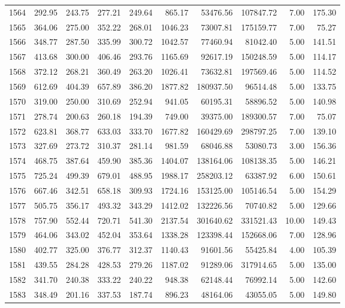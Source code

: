 \begin{tabular}{lrrrrrrrrr}
1564 & 292.95 & 243.75 & 277.21 & 249.64 & 865.17 & 53476.56 & 107847.72 & 7.00 & 175.30 \\
1565 & 364.06 & 275.00 & 352.22 & 268.01 & 1046.23 & 73007.81 & 175159.77 & 7.00 & 75.27 \\
1566 & 348.77 & 287.50 & 335.99 & 300.72 & 1042.57 & 77460.94 & 81042.40 & 5.00 & 141.51 \\
1567 & 413.68 & 300.00 & 406.46 & 293.76 & 1165.69 & 92617.19 & 150248.59 & 5.00 & 114.17 \\
1568 & 372.12 & 268.21 & 360.49 & 263.20 & 1026.41 & 73632.81 & 197569.46 & 5.00 & 114.52 \\
1569 & 612.69 & 404.39 & 657.89 & 386.20 & 1877.82 & 180937.50 & 96514.48 & 5.00 & 133.75 \\
1570 & 319.00 & 250.00 & 310.69 & 252.94 & 941.05 & 60195.31 & 58896.52 & 5.00 & 140.98 \\
1571 & 278.74 & 200.63 & 260.18 & 194.39 & 749.00 & 39375.00 & 189300.57 & 7.00 & 75.07 \\
1572 & 623.81 & 368.77 & 633.03 & 333.70 & 1677.82 & 160429.69 & 298797.25 & 7.00 & 139.10 \\
1573 & 327.69 & 273.72 & 310.37 & 281.14 & 981.59 & 68046.88 & 53080.73 & 3.00 & 156.36 \\
1574 & 468.75 & 387.64 & 459.90 & 385.36 & 1404.07 & 138164.06 & 108138.35 & 5.00 & 146.21 \\
1575 & 725.24 & 499.39 & 679.01 & 488.95 & 1988.17 & 258203.12 & 63387.92 & 6.00 & 150.61 \\
1576 & 667.46 & 342.51 & 658.18 & 309.93 & 1724.16 & 153125.00 & 105146.54 & 5.00 & 154.29 \\
1577 & 505.75 & 356.17 & 493.32 & 343.29 & 1412.02 & 132226.56 & 70740.82 & 5.00 & 129.66 \\
1578 & 757.90 & 552.44 & 720.71 & 541.30 & 2137.54 & 301640.62 & 331521.43 & 10.00 & 149.43 \\
1579 & 464.06 & 343.02 & 452.04 & 353.64 & 1338.28 & 123398.44 & 152668.06 & 7.00 & 128.96 \\
1580 & 402.77 & 325.00 & 376.77 & 312.37 & 1140.43 & 91601.56 & 55425.84 & 4.00 & 105.39 \\
1581 & 439.55 & 284.28 & 428.53 & 279.26 & 1187.02 & 91289.06 & 317914.65 & 5.00 & 135.00 \\
1582 & 341.70 & 240.38 & 333.22 & 240.22 & 948.38 & 62148.44 & 76992.14 & 5.00 & 142.60 \\
1583 & 348.49 & 201.16 & 337.53 & 187.74 & 896.23 & 48164.06 & 43055.05 & 5.00 & 149.80 \\

\end{tabular}
